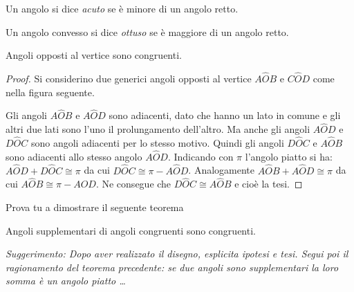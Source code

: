 \begin{definizione}
Un angolo si dice \emph{acuto} se è minore di un angolo retto.
\end{definizione}

\begin{definizione}
Un angolo convesso si dice \emph{ottuso} se è maggiore di un angolo 
retto.
\end{definizione}


\begin{inaccessibleblock}
 \begin{figure}[htb]
\centering
\end{figure}
\end{inaccessibleblock}

\begin{teorema}
Angoli opposti al vertice sono congruenti.
\end{teorema}

\begin{proof}
Si considerino due generici angoli opposti al vertice $A\widehat{O}B$ 
e $C\widehat{O}D$ come nella figura seguente.

\begin{inaccessibleblock}
 \begin{figure}[htb]
\centering
\end{figure}
\end{inaccessibleblock}
Gli angoli $A\widehat{O}B$ e $A\widehat{O}D$ sono adiacenti, dato che 
hanno un lato in comune e gli altri due lati sono l'uno il 
prolungamento dell'altro. Ma anche gli angoli $A\widehat{O}D$ e 
$D\widehat{O}C$ sono angoli adiacenti per lo stesso motivo. Quindi 
gli angoli $D\widehat{O}C$ e $A\widehat{O}B$ sono adiacenti allo 
stesso angolo $A\widehat{O}D$.
Indicando con $\pi$ l'angolo piatto si ha: $A\widehat{O}D + 
D\widehat{O}C \cong \pi$ da cui $D\widehat{O}C\cong \pi - 
A\widehat{O}D$. Analogamente $A\widehat{O}B+A\widehat{O}D\cong\pi$ da 
cui $A\widehat{O}B\cong \pi-A\widehat{O}D$. Ne consegue che 
$D\widehat{O}C\cong A\widehat{O}B$ e cioè la tesi.
\end{proof}

Prova tu a dimostrare il seguente teorema

\begin{teorema}
Angoli supplementari di angoli congruenti sono congruenti.
\end{teorema}

\emph{Suggerimento: Dopo aver realizzato il disegno, esplicita 
ipotesi e tesi. Segui poi il ragionamento del teorema precedente: se 
due angoli sono supplementari la loro somma è un angolo piatto 
\ldots{}}

